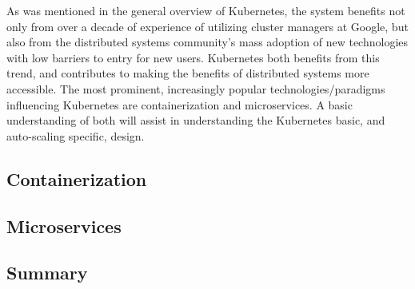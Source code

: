 As was mentioned in the general overview of Kubernetes, the system benefits not
only from over a decade of experience of utilizing cluster managers at Google,
but also from the distributed systems community's mass adoption of new
technologies with low barriers to entry for new users. Kubernetes both benefits
from this trend, and contributes to making the benefits of distributed systems
more accessible. The most prominent, increasingly popular technologies/paradigms
influencing Kubernetes are containerization and microservices.
A basic understanding of both will assist
in understanding the Kubernetes basic, and auto-scaling specific, design.

\subsection{Containerization}
\label{architecture-building-blocks-of-kubernetes-containerization}



\subsection{Microservices}
\label{architecture-building-blocks-of-kubernetes-microservices}



\subsection{Summary}


